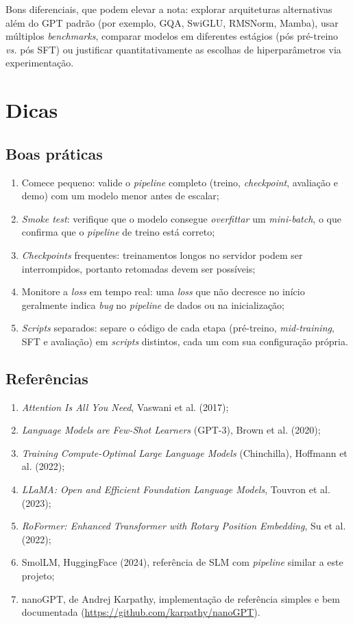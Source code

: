 \documentclass{dlproblemset}
\begin{document}
Bons diferenciais, que podem elevar a nota: explorar arquiteturas alternativas além do GPT padrão (por exemplo, GQA, SwiGLU, RMSNorm, Mamba), usar múltiplos \textit{benchmarks}, comparar modelos em diferentes estágios (pós pré-treino \textit{vs.} pós SFT) ou justificar quantitativamente as escolhas de hiperparâmetros via experimentação.

\section*{Dicas}

\subsection*{Boas práticas}

\begin{enumerate}[1)]
    \item Comece pequeno: valide o \textit{pipeline} completo (treino, \textit{checkpoint}, avaliação e demo) com um modelo menor antes de escalar;
    \item \textit{Smoke test}: verifique que o modelo consegue \textit{overfittar} um \textit{mini-batch}, o que confirma que o \textit{pipeline} de treino está correto;
    \item \textit{Checkpoints} frequentes: treinamentos longos no servidor podem ser interrompidos, portanto retomadas devem ser possíveis;
    \item Monitore a \textit{loss} em tempo real: uma \textit{loss} que não decresce no início geralmente indica \textit{bug} no \textit{pipeline} de dados ou na inicialização;
    \item \textit{Scripts} separados: separe o código de cada etapa (pré-treino, \textit{mid-training}, SFT e avaliação) em \textit{scripts} distintos, cada um com sua configuração própria.
\end{enumerate}

\subsection*{Referências}

\begin{enumerate}[1)]
    \item \textit{Attention Is All You Need}, Vaswani et al. (2017);
    \item \textit{Language Models are Few-Shot Learners} (GPT-3), Brown et al. (2020);
    \item \textit{Training Compute-Optimal Large Language Models} (Chinchilla), Hoffmann et al. (2022);
    \item \textit{LLaMA: Open and Efficient Foundation Language Models}, Touvron et al. (2023);
    \item \textit{RoFormer: Enhanced Transformer with Rotary Position Embedding}, Su et al. (2022);
    \item SmolLM, HuggingFace (2024), referência de SLM com \textit{pipeline} similar a este projeto;
    \item nanoGPT, de Andrej Karpathy, implementação de referência simples e bem documentada (\url{https://github.com/karpathy/nanoGPT}).
\end{enumerate}
\end{document}
